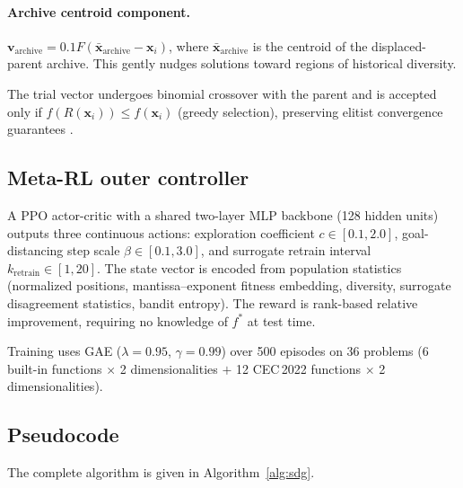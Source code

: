 \documentclass[preprint,12pt,authoryear]{elsarticle}
\begin{document}
\paragraph{Archive centroid component.}
$\mathbf{v}_{\text{archive}} = 0.1 F (\bar{\mathbf{x}}_{\text{archive}} - \mathbf{x}_i)$, where $\bar{\mathbf{x}}_{\text{archive}}$ is the centroid of the displaced-parent archive. This gently nudges solutions toward regions of historical diversity.

The trial vector undergoes binomial crossover with the parent and is accepted only if $f(R(\mathbf{x}_i)) \leq f(\mathbf{x}_i)$ (greedy selection), preserving elitist convergence guarantees \citep{Rudolph1994}.

\subsection{Meta-RL outer controller}
\label{sec:metarl}

A PPO actor-critic \citep{Schulman2017} with a shared two-layer MLP backbone (128 hidden units) outputs three continuous actions: exploration coefficient $c \in [0.1, 2.0]$, goal-distancing step scale $\beta \in [0.1, 3.0]$, and surrogate retrain interval $k_{\text{retrain}} \in [1, 20]$. The state vector is encoded from population statistics (normalized positions, mantissa--exponent fitness embedding, diversity, surrogate disagreement statistics, bandit entropy). The reward is rank-based relative improvement, requiring no knowledge of $f^*$ at test time.

Training uses GAE ($\lambda = 0.95$, $\gamma = 0.99$) over 500 episodes on 36 problems (6 built-in functions $\times$ 2 dimensionalities $+$ 12 CEC\,2022 functions $\times$ 2 dimensionalities).

\subsection{Pseudocode}

The complete algorithm is given in Algorithm~\ref{alg:sdg}.
\end{document}

